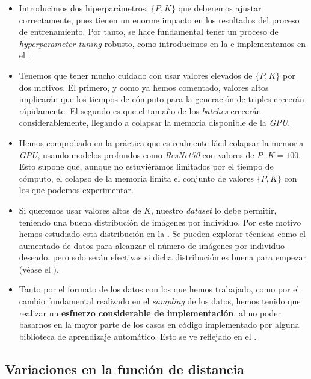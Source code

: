 \begin{itemize}
    \item Introducimos dos hiperparámetros, $\{P, K\}$ que deberemos ajustar correctamente, pues tienen un enorme impacto en los resultados del proceso de entrenamiento. Por tanto, se hace fundamental tener un proceso de \textit{hyperparameter tuning} robusto, como introducimos en la  e implementamos en el .
    \item Tenemos que tener mucho cuidado con usar valores elevados de $\{P, K\}$ por dos motivos. El primero, y como ya hemos comentado, valores altos implicarán que los tiempos de cómputo para la generación de triples crecerán rápidamente. El segundo es que el tamaño de los \textit{batches} crecerán considerablemente, llegando a colapsar la memoria disponible de la \textit{GPU}.
    \item Hemos comprobado en la práctica que es realmente fácil colapsar la memoria \textit{GPU}, usando modelos profundos como \textit{ResNet50} con valores de $P \cdot K = 100$. Esto supone que, aunque no estuviéramos limitados por el tiempo de cómputo, el colapso de la memoria limita el conjunto de valores $\{P, K\}$ con los que podemos experimentar.
    \item Si queremos usar valores altos de $K$, nuestro \textit{dataset} lo debe permitir, teniendo una buena distribución de imágenes por individuo. Por este motivo hemos estudiado esta distribución en la . Se pueden explorar técnicas como el aumentado de datos para alcanzar el número de imágenes por individuo deseado, pero solo serán efectivas si dicha distribución es buena para empezar (véase el ).
    \item Tanto por el formato de los datos con los que hemos trabajado, como por el cambio fundamental realizado en el \textit{sampling} de los datos, hemos tenido que realizar un \textbf{esfuerzo considerable de implementación}, al no poder basarnos en la mayor parte de los casos en código implementado por alguna biblioteca de aprendizaje automático. Esto se ve reflejado en el .
\end{itemize}

\subsection{Variaciones en la función de distancia}

